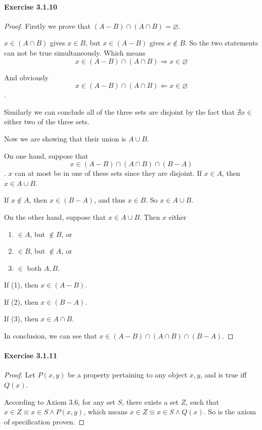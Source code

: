 \paragraph{Exercise 3.1.10} \label{exercise3.1.10}
\begin{proof}
Firstly we prove that $(A-B)\cap (A\cap B) = \varnothing$.

$x \in (A\cap B)$ gives $x \in B$, but $x \in (A-B)$ gives $x \notin B$. So the two statements can not 
be true simultaneously. Which means 
\[
x\in (A-B)\cap (A\cap B) \Longrightarrow x \in \varnothing
\]

And obviously 
\[
x\in (A-B)\cap (A\cap B) \Longleftarrow x \in \varnothing
\].

Similarly we can conclude all of the three sets are disjoint by the fact that $\nexists x \in$ either 
two of the three sets.

Now we are showing that their union is $A \cup B$.

On one hand, suppose that 
\[
x \in (A-B)\cap(A\cap B)\cap(B-A)
\].
$x$ can at most be in one of these sets since they are disjoint.
If $x \in A$, then $x \in A \cup B$.

If $x \notin A$, then $x \in (B-A)$, and thus $x \in B$. So $x \in A \cup B$.

On the other hand, suppose that $x \in A \cup B$.
Then $x$ either
\begin{enumerate}
\item $\in A$, but $\notin B$, or
\item $\in B$, but $\notin A$, or
\item $\in$ both $A,B$.
\end{enumerate}

If (1), then $x \in (A-B)$.

If (2), then $x \in (B-A)$.

If (3), then $x \in A\cap B$.

In conclusion, we can see that $x \in (A-B)\cap(A\cap B)\cap(B-A)$.
\end{proof}

\paragraph{Exercise 3.1.11} \label{exercise3.1.11}
\begin{proof}
Let $P(x,y)$ be a property pertaining to any object $x,y$, and is true iff $Q(x)$.

According to Axiom 3.6, for any set $S$, there exists a set $Z$, such that 
$x \in Z \equiv x \in S \wedge P(x,y)$, which means $x \in Z \equiv x \in S \wedge Q(x)$. So 
is the axiom of specification proven.
\end{proof}